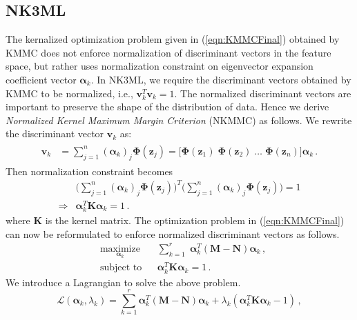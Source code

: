 \documentclass[runningheads]{llncs}
\begin{document}
\subsection{NK3ML}
\label{ssec:NK3ML}

The kernalized optimization problem given in (\ref{eqn:KMMCFinal}) obtained by KMMC\cite{haifeng:mmc} does not enforce normalization of discriminant vectors in the feature space, but rather uses normalization constraint on eigenvector expansion coefficient vector $\bm{\alpha}_k$. In NK3ML, we require the discriminant vectors obtained by KMMC  to be normalized, i.e., $\mathbf{v}_k^T\mathbf{v}_k =1$. The normalized discriminant vectors are important to preserve the shape of the distribution of data. Hence we derive \textit{Normalized Kernel Maximum Margin Criterion} (NKMMC) as follows. We rewrite the discriminant vector $\mathbf{v}_k$ as:
\begin{eqnarray}
\begin{aligned}
\mathbf{v}_k &= \sum \limits_{j=1}^{n} (\bm{\alpha}_{k})_j \mathbf{\Phi}(\mathbf{z}_j) = \Big[\mathbf{\Phi}(\mathbf{z}_1) \; \mathbf{\Phi}(\mathbf{z}_2)\; \ldots \;\mathbf{\Phi}(\mathbf{z}_n) \Big] \bm{\alpha}_k \,.
\end{aligned}
\end{eqnarray}
\noindent Then normalization constraint becomes
\begin{eqnarray}
&\Big(\sum \limits_{j=1}^{n} (\bm{\alpha}_{k})_j \mathbf{\Phi}(\mathbf{z}_j)\Big)^T \Big(\sum \limits_{j=1}^{n} (\bm{\alpha}_{k})_j \mathbf{\Phi}(\mathbf{z}_j)\Big) =1 \nonumber\\
\Rightarrow &\bm{\alpha}_k^T \mathbf{K} \bm{\alpha}_k =1 \,.
\end{eqnarray}
where $\mathbf{K}$ is the kernel matrix. The optimization problem in (\ref{eqn:KMMCFinal}) can now be reformulated to enforce normalized discriminant vectors as follows.
\begin{equation}
\begin{aligned}
& \underset{\bm{\alpha}_{k}}{\text{maximize}} & & \sum\limits_{k=1}^r \;  \bm{\alpha}^T_{k} (\mathbf{M}  -  \mathbf{N}) \bm{\alpha}_{k} \,,\\
\label{eqn:CKMMCFinal}
& \text{subject to}     & & \bm{\alpha}^T_{k}\mathbf{K} \bm{\alpha}_{k} = 1 \,.
\end{aligned}
\end{equation}
\noindent We introduce a Lagrangian to solve the above problem.
\begin{equation}
\mathcal{L}(\bm{\alpha}_k,\lambda_k) = 
\sum \limits_{k=1}^{r} \bm{\alpha}_k^T (\mathbf{M-N}) \bm{\alpha}_k + \lambda_k(\bm{\alpha}^T_{k}\mathbf{K} \bm{\alpha}_{k} - 1) \,,
\end{equation}
\end{document}
